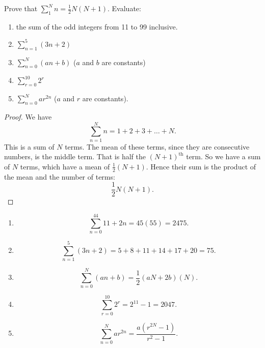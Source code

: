 Prove that $\sum^N_1 n = \frac{1}{2}N(N+1)$.
\newline
Evaluate:
\begin{enumerate}
\item the sum of the odd integers from 11 to 99 inclusive.
\item $\sum_{n=1}^5(3n+2)$
\item $\sum^N_{n=0}(an+b)$ ($a$ and $b$ are constants)
\item $\sum_{r=0}^{10}2^r$
\item $\sum_{n=0}^N ar^{2n}$ ($a$ and $r$ are constants).
\end{enumerate}
\begin{proof}
We have
\[
\sum^N_{n=1} n = 1 + 2 + 3 + \hdots + N.
\]
This is a sum of $N$ terms. The mean of these terms, since they are consecutive numbers, is the middle term. That is half the $(N+1)^{\text{th}}$ term. So we have a sum of $N$ terms, which have a mean of $\frac{1}{2}(N+1)$. Hence their sum is the product of the mean and the number of terms:
\[
\frac{1}{2}N(N+1).
\]
\end{proof}
\begin{enumerate}
\item
\[
\sum_{n=0}^{44}11 + 2n = 45(55) = 2475.
\]
\item
\[
\sum^{5}_{n=1} (3n+2) = 5 + 8 + 11 + 14 + 17 + 20 = 75.
\]
\item
\[
\sum^{N}_{n=0}(an+b) = \frac{1}{2}(aN + 2b)(N).
\]
\item
\[
\sum_{r=0}^{10}2^r = 2^{11} - 1 = 2047.
\]
\item
\[
\sum^N_{n=0}ar^{2n} = \frac{a(r^{2N} - 1)}{r^2-1}.
\]
\end{enumerate}